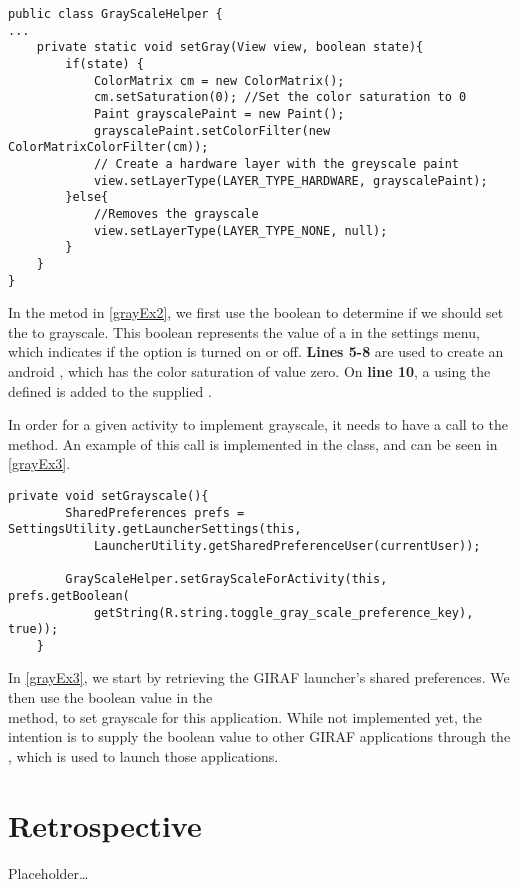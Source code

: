 \begin{minipage}[H]{\linewidth}
\begin{lstlisting}[caption = Method used to change to color saturation of views., label = grayEx2]
public class GrayScaleHelper {
...
    private static void setGray(View view, boolean state){
        if(state) {
            ColorMatrix cm = new ColorMatrix();
            cm.setSaturation(0); //Set the color saturation to 0
            Paint grayscalePaint = new Paint();
            grayscalePaint.setColorFilter(new ColorMatrixColorFilter(cm));
            // Create a hardware layer with the greyscale paint
            view.setLayerType(LAYER_TYPE_HARDWARE, grayscalePaint);
        }else{
            //Removes the grayscale
            view.setLayerType(LAYER_TYPE_NONE, null);
        }
    }
}
\end{lstlisting}
\end{minipage}

In the  metod in \autoref{grayEx2}, we first use the boolean
 to determine if we should set the  to grayscale. This
boolean represents the value of a  in the settings menu,
which indicates if the option is turned on or off. \textbf{Lines 5-8} are used
to create an android , which has the color saturation of value
zero. On \textbf{line 10}, a  using the defined
 is added to the supplied .\nl

In order for a given activity to implement grayscale, it needs to have a call to
the  method. An example of this call is
implemented in the  class, and can be seen in
\autoref{grayEx3}.\nl

\begin{minipage}[H]{\linewidth}
\begin{lstlisting}[caption = Setting grayscale by calling the setGrayScaleForActivity method, label = grayEx3] 
private void setGrayscale(){
        SharedPreferences prefs = SettingsUtility.getLauncherSettings(this,
            LauncherUtility.getSharedPreferenceUser(currentUser));

        GrayScaleHelper.setGrayScaleForActivity(this, prefs.getBoolean(
            getString(R.string.toggle_gray_scale_preference_key), true));
    }
\end{lstlisting}
\end{minipage}

In \autoref{grayEx3}, we start by retrieving the GIRAF launcher's shared
preferences. We then use the boolean
 value in the \\
 method, to set grayscale for this
application. While not implemented yet, the intention is to supply the boolean
value to other GIRAF applications through the , which is
used to launch those applications.














\section{Retrospective}
Placeholder\ldots